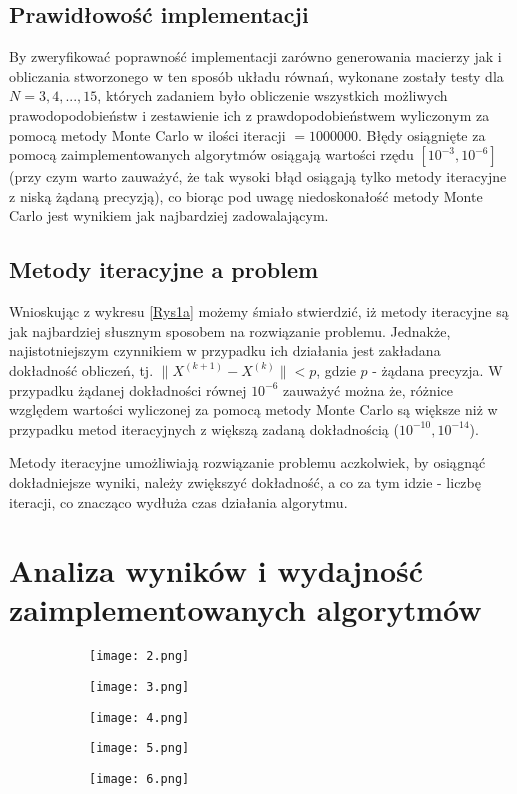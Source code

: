 \documentclass[10pt]{article}
\begin{document}
\subsection{Prawidłowość implementacji}
By zweryfikować poprawność implementacji zarówno generowania macierzy jak i obliczania stworzonego w ten sposób układu równań, wykonane zostały testy dla $N = 3,4,...,15$, których zadaniem było obliczenie wszystkich możliwych prawodopodobieństw i zestawienie ich z prawdopodobieństwem wyliczonym za pomocą metody Monte Carlo w ilości iteracji $=1000000$.
Błędy osiągnięte za pomocą zaimplementowanych algorytmów osiągają wartości rzędu $[10^{-3},10^{-6}]$ (przy czym warto zauważyć, że tak wysoki błąd osiągają tylko metody iteracyjne z niską żądaną precyzją), co biorąc pod uwagę niedoskonałość metody Monte Carlo jest wynikiem jak najbardziej zadowalającym.
\subsection{Metody iteracyjne a problem}
Wnioskując z wykresu \ref{Rys1a} możemy śmiało stwierdzić, iż metody iteracyjne są jak najbardziej słusznym sposobem na rozwiązanie problemu. Jednakże, najistotniejszym czynnikiem w przypadku ich działania jest zakładana dokładność obliczeń, tj. $\|{X^{(k+1)}-X^{(k)}}\| < p$, gdzie $p$ - żądana precyzja.
W przypadku żądanej dokładności równej $10^{-6}$ zauważyć można że, różnice względem wartości wyliczonej za pomocą metody Monte Carlo są większe niż w przypadku metod iteracyjnych z większą zadaną dokładnością ($10^{-10}, 10^{-14}$).
\begin{wn}
	Metody iteracyjne umożliwiają rozwiązanie problemu aczkolwiek, by osiągnąć dokładniejsze wyniki, należy zwiększyć dokładność, a co za tym idzie - liczbę iteracji, co znacząco wydłuża czas działania algorytmu. \label{wn:1}
\end{wn}
\section{Analiza wyników i wydajność zaimplementowanych algorytmów}
\begin{figure}[h]
	\caption{Wykresy reprezentujące czas wykonania i błędy bezwzględne zaimplementowanych algorytmów \label{rys}}
	\begin{subfigure}{0.5\textwidth}
		\texttt{[image: 2.png]}
		\caption{ \label{Rys2a}}
	\end{subfigure}
	\begin{subfigure}{0.5\textwidth}
	\texttt{[image: 3.png]}
	\caption{ \label{Rys2b}}
	\end{subfigure}
	\begin{subfigure}{0.5\textwidth}
	\texttt{[image: 4.png]}
	\caption{ \label{Rys2c}}
\end{subfigure}
	\begin{subfigure}{0.5\textwidth}
	\texttt{[image: 5.png]}
	\caption{ \label{Rys2d}}
\end{subfigure}
	\begin{subfigure}{0.5\textwidth}
	\texttt{[image: 6.png]}
	\caption{ \label{Rys2e}}
\end{subfigure}
\end{figure}
\end{document}
